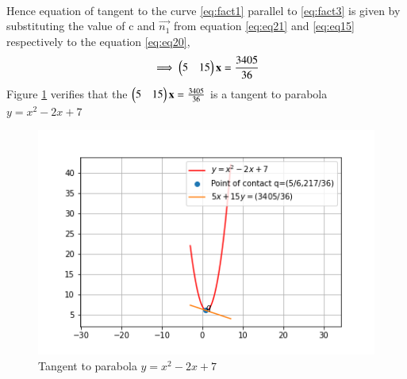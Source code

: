 \documentclass[journal,12pt,twocolumn]{IEEEtran}
\begin{document}
\begin{enumerate}
\begin{align}
		\label{eq:eq21}
	\end{align}
	Hence equation of tangent to the curve \eqref{eq:fact1} parallel to \eqref{eq:fact3} is given by substituting the value of c and $\vec{n_1}$ from equation \eqref{eq:eq21} and \eqref{eq:eq15} respectively to the equation \eqref{eq:eq20},
	\begin{align}
		\implies\begin{pmatrix}5&15\end{pmatrix}\mathbf{x} = \frac{3405}{36} 
	\end{align}
	Figure \ref{eq:fig2} verifies that the $\begin{pmatrix}5&15\end{pmatrix}\mathbf{x} = \frac{3405}{36}$ is a tangent to parabola  $y = x^2-2x+7$
	\begin{figure}[ht!]
		\centering
		\includegraphics[width=\columnwidth]{./codes/perpendicularLineTangent.png}
		\caption{Tangent to parabola $y = x^2-2x+7$}
		\label{eq:fig2}
	\end{figure}

	\end{enumerate}
		
	
\end{document}
